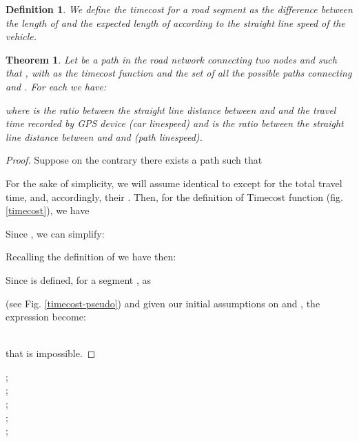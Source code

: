 \documentclass[5p]{elsarticle}
\newtheorem{definition}{Definition}
\newtheorem{theorem}{Theorem}
\begin{document}
\begin{definition}
We define the \emph{timecost} for a road segment  as the difference between the length of  and the expected length of  according to the straight line speed of the vehicle.
\end{definition}

\begin{theorem}

Let  be a path in the road network connecting two nodes  and  such that , with  as the timecost function and  the set of all the possible paths connecting  and . For
each  we have:

where  is the ratio between the straight line distance between  and  and the travel time recorded by GPS device (car linespeed)
 and  is the ratio between the straight line distance between  and  and  (path linespeed).
\end{theorem}

\begin{proof}
Suppose on the contrary there exists a path  such that

For the sake of simplicity, we will assume  identical to  except for the total travel time, and, accordingly, their  . Then, for the definition of Timecost function (fig. \ref{timecost}),
we have

Since ,  we can simplify:

Recalling the definition of   we have then:

\newline
Since  is defined, for a segment , as 
\newline
 
(see Fig. \ref{timecost-pseudo}) and given our initial assumptions on  and , the expression become:

\\
that is impossible.

\end{proof}


 \begin{algorithm2e} [h]
\scriptsize{
\BlankLine
;\\
;\\
;\\
;\\
\Return {}; 
        


\caption{}
\label{timecost-pseudo}}
\end{algorithm2e}
\end{document}
